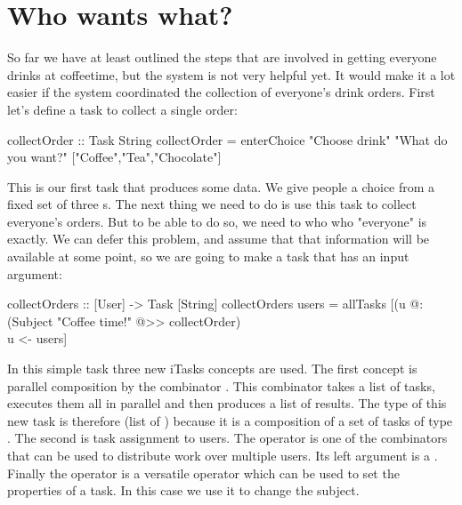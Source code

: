\documentclass[a4paper,11pt]{article}
\begin{document}
\section{Who wants what?}
So far we have at least outlined the steps that are involved in getting everyone drinks at coffeetime, but the system is not very helpful yet.
It would make it a lot easier if the system coordinated the collection of everyone's drink orders. First let's define a task to collect a single order:
\begin{CleanCode}
collectOrder :: Task String
collectOrder 
	= enterChoice "Choose drink" "What do you want?" ["Coffee","Tea","Chocolate"]
\end{CleanCode}
This is our first task that produces some data. We give people a choice from a fixed set of three s. The next thing we need to do is use this task to collect everyone's orders. But to be able to do so, we need to who who "everyone" is exactly. We can defer this problem, and assume that that information will be available at some point, so we are going to make a task that has an input argument:
\begin{CleanCode}
collectOrders :: [User] -> Task [String]
collectOrders users 
	= allTasks [(u @: (Subject "Coffee time!" @>> collectOrder) \\ u <- users]
\end{CleanCode}
In this simple task three new iTasks concepts are used. The first concept is parallel composition by the combinator . This combinator takes a list of tasks, executes them all in parallel and then produces a list of results. The type of this new task is therefore \CleanInline{[String]} (list of ) because it is a composition of a set of tasks of type . The second is task assignment to users. The  operator is one of the combinators that can be used to distribute work over multiple users. Its left argument is a . Finally the  operator is a versatile operator which can be used to set the properties of a task. In this case we use it to change the subject.
\end{document}
